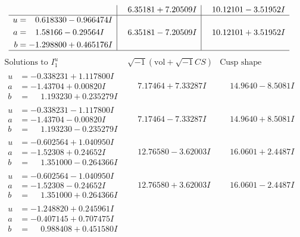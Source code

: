 \documentclass[1p]{elsarticle_modified}
\theoremstyle{definition}
\newcommand{\I}{\sqrt{-1}}
\begin{document}
$$\begin{array}{c|c|c}
 & \phantom{-}6.35181 + 7.20509 I & \phantom{-}10.12101 - 3.51952 I \\ \hline\begin{aligned}
u &= \phantom{-}0.618330 - 0.966474 I \\
a &= \phantom{-}1.58166 - 0.29564 I \\
b &= -1.298800 + 0.465176 I\end{aligned}
 & \phantom{-}6.35181 - 7.20509 I & \phantom{-}10.12101 + 3.51952 I\\
 \hline 
 \end{array}$$\newpage$$\begin{array}{c|c|c}  
\text{Solutions to }I^u_{1}& \I (\text{vol} + \sqrt{-1}CS) & \text{Cusp shape}\\
 \hline 
\begin{aligned}
u &= -0.338231 + 1.117800 I \\
a &= -1.43704 + 0.00820 I \\
b &= \phantom{-}1.193230 + 0.235279 I\end{aligned}
 & \phantom{-}7.17464 + 7.33287 I & \phantom{-}14.9640 - 8.5081 I \\ \hline\begin{aligned}
u &= -0.338231 - 1.117800 I \\
a &= -1.43704 - 0.00820 I \\
b &= \phantom{-}1.193230 - 0.235279 I\end{aligned}
 & \phantom{-}7.17464 - 7.33287 I & \phantom{-}14.9640 + 8.5081 I \\ \hline\begin{aligned}
u &= -0.602564 + 1.040950 I \\
a &= -1.52308 + 0.24652 I \\
b &= \phantom{-}1.351000 - 0.264366 I\end{aligned}
 & \phantom{-}12.76580 - 3.62003 I & \phantom{-}16.0601 + 2.4487 I \\ \hline\begin{aligned}
u &= -0.602564 - 1.040950 I \\
a &= -1.52308 - 0.24652 I \\
b &= \phantom{-}1.351000 + 0.264366 I\end{aligned}
 & \phantom{-}12.76580 + 3.62003 I & \phantom{-}16.0601 - 2.4487 I \\ \hline\begin{aligned}
u &= -1.248820 + 0.245961 I \\
a &= -0.407145 + 0.707475 I \\
b &= \phantom{-}0.988408 + 0.451580 I\end{aligned}

\end{array}$$
\end{document}
